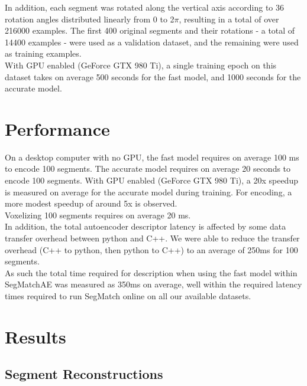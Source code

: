 In addition, each segment was rotated along the vertical axis according to 36 rotation angles distributed linearly from 0 to 2$\pi$, resulting in a total of over 216000 examples. The first 400 original segments and their rotations - a total of 14400 examples - were used as a validation dataset, and the remaining were used as training examples.\\

With GPU enabled (GeForce GTX 980 Ti), a single training epoch on this dataset takes on average 500 seconds for the fast model, and 1000 seconds for the accurate model.\\

\section{Performance}
\label{sec:ae-performance}

On a desktop computer with no GPU, the fast model requires on average 100 ms to encode 100 segments.
The accurate model requires on average 20 seconds to encode 100 segments. With GPU enabled (GeForce GTX 980 Ti), a 20x speedup is measured on average for the accurate model during training. For encoding, a more modest speedup of around 5x is observed.\\

Voxelizing 100 segments requires on average 20 ms.\\

In addition, the total autoencoder descriptor latency is affected by some data transfer overhead between python and C++. We were able to reduce the transfer overhead (C++ to python, then python to C++) to an average of 250ms for 100 segments.\\

As such the total time required for description when using the fast model within SegMatchAE was measured as 350ms on average, well within the required latency times required to run SegMatch online on all our available datasets.\\

\section{Results}
\label{sec:ae-results}

\subsection{Segment Reconstructions}

